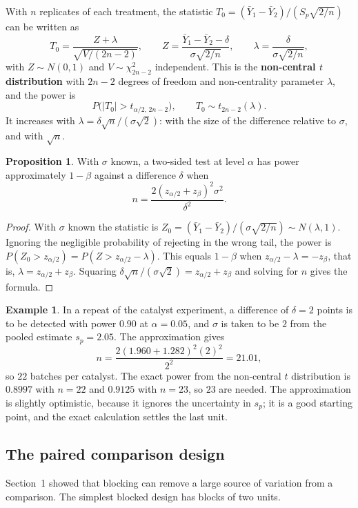 \documentclass[11pt,a4paper]{article}
\numberwithin{equation}{section}
\theoremstyle{definition}
\newtheorem{exa}[thm]{Example}
\newtheorem{prop}[thm]{Proposition}
\begin{document}
With $n$ replicates of each treatment, the statistic $T_0 = (\bar Y_1 - \bar Y_2)/(S_p\sqrt{2/n})$ can be written as
\[
T_0 = \frac{Z + \lambda}{\sqrt{V/(2n - 2)}} , \qquad Z = \frac{\bar Y_1 - \bar Y_2 - \delta}{\sigma\sqrt{2/n}} , \qquad \lambda = \frac{\delta}{\sigma\sqrt{2/n}} ,
\]
with $Z \sim N(0, 1)$ and $V \sim \chi^2_{2n-2}$ independent. This is the \textbf{non-central $t$ distribution} with $2n - 2$ degrees of freedom and non-centrality
parameter $\lambda$, and the power is
\[
P\bigl(|T_0| > t_{\alpha/2,\,2n-2}\bigr) , \qquad T_0 \sim t_{2n-2}(\lambda) .
\]
It increases with $\lambda = \delta\sqrt n/(\sigma\sqrt2)$: with the size of the difference relative to $\sigma$, and with $\sqrt n$.

\begin{prop}\label{prop:sample-size}
With $\sigma$ known, a two-sided test at level $\alpha$ has power approximately $1 - \beta$ against a
difference $\delta$ when
\[
n = \frac{2(z_{\alpha/2} + z_\beta)^2\sigma^2}{\delta^2} .
\]
\end{prop}

\begin{proof}
With $\sigma$ known the statistic is $Z_0 = (\bar Y_1 - \bar Y_2)/(\sigma\sqrt{2/n}) \sim N(\lambda, 1)$. Ignoring the negligible probability of rejecting in the wrong tail,
the power is $P(Z_0 > z_{\alpha/2}) = P(Z > z_{\alpha/2} - \lambda)$. This equals $1 - \beta$ when $z_{\alpha/2} - \lambda = -z_\beta$, that is, $\lambda = z_{\alpha/2} + z_\beta$. Squaring
$\delta\sqrt n/(\sigma\sqrt2) = z_{\alpha/2} + z_\beta$ and solving for $n$ gives the formula.
\end{proof}

\begin{exa}
In a repeat of the catalyst experiment, a difference of $\delta = 2$ points is to be detected with power $0.90$ at $\alpha = 0.05$, and $\sigma$ is taken to be
$2$ from the pooled estimate $s_p = 2.05$. The approximation gives
\[
n = \frac{2(1.960 + 1.282)^2(2)^2}{2^2} = 21.01 ,
\]
so $22$ batches per catalyst. The exact power from the non-central $t$ distribution is $0.8997$ with $n = 22$ and $0.9125$ with $n = 23$, so $23$ are
needed. The approximation is slightly optimistic, because it ignores the uncertainty in $s_p$; it is a good starting point, and the exact
calculation settles the last unit.
\end{exa}

\subsection{The paired comparison design}
Section~1 showed that blocking can remove a large source of variation from a comparison. The simplest blocked design has blocks of two units.
\end{document}
